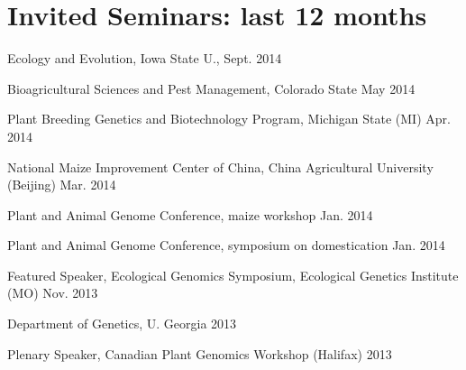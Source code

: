 \documentclass[letterpaper]{article}
\renewenvironment{itemize}{
  \begin{list}{}{
    \setlength{\leftmargin}{1.5em}
  }
}{
  \end{list}
}
\begin{document}
\section*{Invited Seminars: last 12 months}
\begin{itemize}

\item Ecology and Evolution, Iowa State U., Sept. 2014
\item Bioagricultural Sciences and Pest Management, Colorado State May 2014
\item Plant Breeding Genetics and Biotechnology Program, Michigan State (MI) Apr. 2014
\item National Maize Improvement Center of China, China Agricultural University (Beijing) Mar. 2014
\item Plant and Animal Genome Conference, maize workshop Jan. 2014
\item Plant and Animal Genome Conference, symposium on domestication Jan. 2014
\item Featured Speaker, Ecological Genomics Symposium, Ecological Genetics Institute (MO) Nov. 2013
\item Department of Genetics, U. Georgia 2013
\item Plenary Speaker, Canadian Plant Genomics Workshop (Halifax) 2013

\end{itemize}
\end{document}
